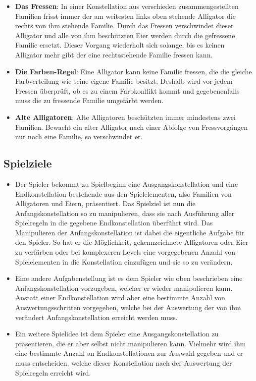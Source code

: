 	\begin{itemize}
	
	\item \textbf{Das Fressen}: In einer Konstellation aus verschieden zusammengestellten Familien frisst immer der am weitesten links oben stehende Alligator die rechts von ihm stehende Familie. Durch das Fressen verschwindet dieser Alligator und alle von ihm beschützten Eier werden durch die gefressene Familie ersetzt. Dieser Vorgang wiederholt sich solange, bis es keinen Alligator mehr gibt der eine rechtsstehende Familie fressen kann.
	
	\item \textbf{Die Farben-Regel}: Eine Alligator kann keine Familie fressen, die die gleiche Farbverteilung wie seine eigene Familie besitzt.  Deshalb wird vor jedem Fressen überprüft, ob es zu einem Farbkonflikt kommt und gegebenenfalls muss die zu fressende Familie umgefärbt werden.
	
	\item \textbf{Alte Alligatoren}: Alte Alligatoren beschützten immer mindestens zwei Familien. Bewacht ein alter Alligator nach einer Abfolge von Fressvorgängen nur noch eine Familie, so verschwindet er.
	
	\end{itemize}	
	
\subsection{Spielziele}
	
	\begin{itemize}
	
		\item Der Spieler bekommt zu Spielbeginn eine Ausgangskonstellation und eine Endkonstellation bestehende aus den Spielelementen, also Familien von Alligatoren und Eiern, präsentiert. Das Spielziel ist nun die Anfangskonstellation so zu manipulieren, dass sie nach Ausführung aller Spielregeln in die gegebene Endkonstellation überführt wird. Das Manipulieren der Anfangskonstellation ist dabei die eigentliche Aufgabe für den Spieler. So hat er die Möglichkeit, gekennzeichnete Alligatoren oder Eier zu verfärben oder bei komplexeren Levels eine vorgegebenen Anzahl von Spielelementen in die Konstellation einzufügen und sie so zu verändern.
		
		\item Eine andere Aufgabenstellung ist es dem Spieler wie oben beschrieben eine Anfangskonstellation vorzugeben, welcher er wieder manipulieren kann. Anstatt einer Endkonstellation wird aber eine bestimmte Anzahl von Auswertungsschritten vorgegeben, welche bei der Auswertung der von ihm verändert Anfangskonstellation erreicht werden muss.
		
		\item Ein weitere Spielidee ist dem Spieler eine Ausgangskonstellation zu präsentieren, die er aber selbst nicht manipulieren kann. Vielmehr wird ihm eine bestimmte Anzahl an Endkonstellationen zur Auswahl gegeben und er muss entscheiden, welche dieser Konstellation nach der Auswertung der Spielregeln erreicht wird.
		
	\end{itemize}

	
